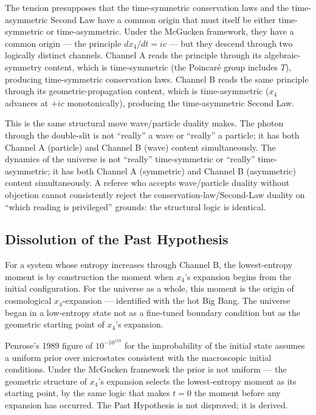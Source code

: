 \documentclass[11pt,a4paper]{article}
\begin{document}
The tension presupposes that the time-symmetric conservation laws and the time-asymmetric Second Law have a common origin that must itself be either time-symmetric or time-asymmetric. Under the McGucken framework, they have a common origin --- the principle $dx_4/dt = ic$ --- but they descend through two logically distinct channels. Channel A reads the principle through its algebraic-symmetry content, which is time-symmetric (the Poincar\'e group includes $T$), producing time-symmetric conservation laws. Channel B reads the same principle through its geometric-propagation content, which is time-asymmetric ($x_4$ advances at $+ic$ monotonically), producing the time-asymmetric Second Law.

This is the same structural move wave/particle duality makes. The photon through the double-slit is not ``really'' a wave or ``really'' a particle; it has both Channel A (particle) and Channel B (wave) content simultaneously. The dynamics of the universe is not ``really'' time-symmetric or ``really'' time-asymmetric; it has both Channel A (symmetric) and Channel B (asymmetric) content simultaneously. A referee who accepts wave/particle duality without objection cannot consistently reject the conservation-law/Second-Law duality on ``which reading is privileged'' grounds: the structural logic is identical.

\subsection{Dissolution of the Past Hypothesis}

For a system whose entropy increases through Channel B, the lowest-entropy moment is by construction the moment when $x_4$'s expansion begins from the initial configuration. For the universe as a whole, this moment is the origin of cosmological $x_4$-expansion --- identified with the hot Big Bang. The universe began in a low-entropy state not as a fine-tuned boundary condition but as the geometric starting point of $x_4$'s expansion.

Penrose's 1989 figure of $10^{-10^{123}}$ for the improbability of the initial state assumes a uniform prior over microstates consistent with the macroscopic initial conditions. Under the McGucken framework the prior is not uniform --- the geometric structure of $x_4$'s expansion selects the lowest-entropy moment as its starting point, by the same logic that makes $t = 0$ the moment before any expansion has occurred. The Past Hypothesis is not disproved; it is derived.
\end{document}
